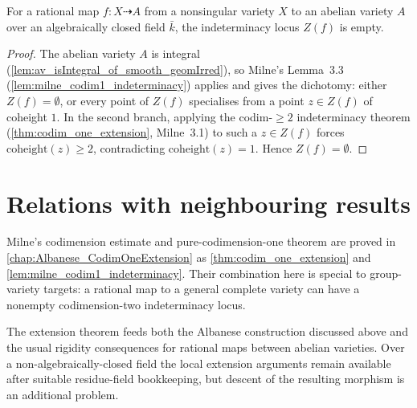 \begin{lemma}\leanok
  \label{lem:av_indeterminacyLocus_eq_empty}
  For a rational map \(f \colon X \dashrightarrow A\) from a nonsingular variety
  \(X\) to an abelian variety \(A\) over an algebraically closed field \(\bar k\),
  the indeterminacy locus \(Z(f)\) is empty.
\end{lemma}
\begin{proof}
  The abelian variety \(A\) is integral
  (\cref{lem:av_isIntegral_of_smooth_geomIrred}), so Milne's Lemma~3.3
  (\cref{lem:milne_codim1_indeterminacy}) applies and gives the dichotomy: either
  \(Z(f) = \emptyset\), or every point of \(Z(f)\) specialises from a point
  \(z \in Z(f)\) of coheight \(1\). In the second branch, applying the
  codim-\(\geq 2\) indeterminacy theorem (\cref{thm:codim_one_extension},
  Milne~3.1) to such a \(z \in Z(f)\) forces \(\mathrm{coheight}(z) \geq 2\),
  contradicting \(\mathrm{coheight}(z) = 1\). Hence \(Z(f) = \emptyset\).
\end{proof}

\section{Relations with neighbouring results}
\label{sec:thm32_out_of_scope}

Milne's codimension estimate and pure-codimension-one theorem are proved in
\cref{chap:Albanese_CodimOneExtension} as
\cref{thm:codim_one_extension} and
\cref{lem:milne_codim1_indeterminacy}.  Their combination here is special to
group-variety targets: a rational map to a general complete variety can have
a nonempty codimension-two indeterminacy locus.

The extension theorem feeds both the Albanese construction discussed above
and the usual rigidity consequences for rational maps between abelian
varieties.  Over a non-algebraically-closed field the local extension
arguments remain available after suitable residue-field bookkeeping, but
descent of the resulting morphism is an additional problem.
